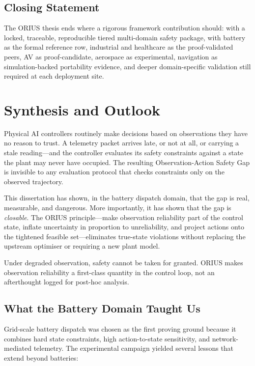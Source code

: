 \subsection{Closing Statement}

The ORIUS thesis ends where a rigorous framework contribution should: with
a locked, traceable, reproducible tiered multi-domain safety package, with
battery as the formal reference row, industrial and healthcare as the
proof-validated peers, AV as proof-candidate, aerospace as experimental,
navigation as simulation-backed portability evidence, and deeper
domain-specific validation still required at each deployment site.



\section{Synthesis and Outlook}
\label{ch:synthesis-outlook}

Physical AI controllers routinely make decisions based on observations they
have no reason to trust.  A telemetry packet arrives late, or not at all,
or carrying a stale reading---and the controller evaluates its safety
constraints against a state the plant may never have occupied.  The
resulting Observation-Action Safety Gap is invisible to any evaluation
protocol that checks constraints only on the observed trajectory.

This dissertation has shown, in the battery dispatch domain, that the gap
is real, measurable, and dangerous.  More importantly, it has shown that
the gap is \emph{closable}.  The ORIUS principle---make observation
reliability part of the control state, inflate uncertainty in proportion to
unreliability, and project actions onto the tightened feasible set---eliminates
true-state violations without replacing the upstream optimiser or requiring
a new plant model.

Under degraded observation, safety cannot be taken for granted.  ORIUS makes
observation reliability a first-class quantity in the control loop, not an
afterthought logged for post-hoc analysis.

\subsection{What the Battery Domain Taught Us}

Grid-scale battery dispatch was chosen as the first proving ground because
it combines hard state constraints, high action-to-state sensitivity, and
network-mediated telemetry.  The experimental campaign yielded several
lessons that extend beyond batteries:

